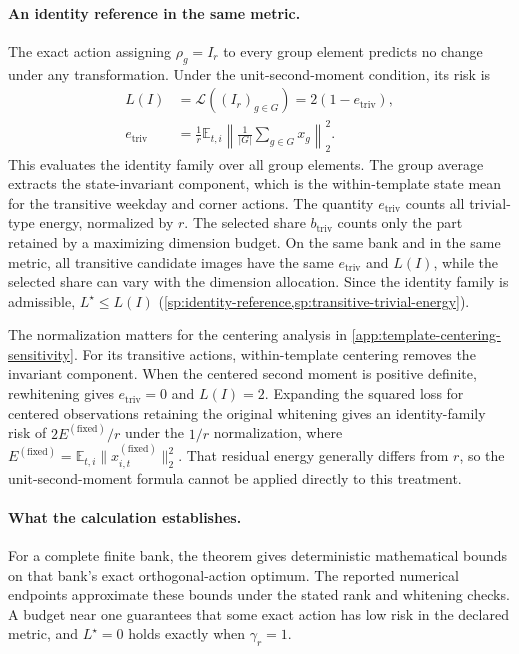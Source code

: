 \paragraph{An identity reference in the same metric.}
The exact action assigning $\rho_g=I_r$ to every group
element predicts no change under any transformation.
Under the unit-second-moment condition, its risk is
\begin{equation}
 \begin{aligned}
 L(I)
 &=
 \mathcal L((I_r)_{g\in G})
 =
 2(1-e_{\mathrm{triv}}),\\
 e_{\mathrm{triv}}
 &=
 \frac1r\mathbb E_{t,i}
 \left\|
   \frac1{|G|}\sum_{g\in G}x_g
 \right\|_2^2.
 \end{aligned}
 \label{eq:identity-reference-main}
\end{equation}
This evaluates the identity family over all group elements.
The group average extracts the state-invariant component,
which is the within-template state mean for the transitive
weekday and corner actions.
The quantity $e_{\mathrm{triv}}$ counts all trivial-type
energy, normalized by $r$.
The selected share $b_{\mathrm{triv}}$ counts only the part
retained by a maximizing dimension budget.
On the same bank and in the same metric, all transitive
candidate images have the same $e_{\mathrm{triv}}$ and
$L(I)$, while the selected share can vary with the dimension
allocation.
Since the identity family is admissible,
$L^\star\le L(I)$
(\cref{sp:identity-reference,sp:transitive-trivial-energy}).

The normalization matters for the centering analysis in
\cref{app:template-centering-sensitivity}.
For its transitive actions, within-template centering
removes the invariant component.
When the centered second moment is positive definite,
rewhitening gives $e_{\mathrm{triv}}=0$ and $L(I)=2$.
Expanding the squared loss for centered observations retaining
the original whitening gives an identity-family risk of
$2E^{(\mathrm{fixed})}/r$ under the $1/r$ normalization, where
$E^{(\mathrm{fixed})}
=\mathbb E_{t,i}\|x^{(\mathrm{fixed})}_{i,t}\|_2^2$.
That residual energy generally differs from $r$, so the
unit-second-moment formula cannot be applied directly to
this treatment.

\paragraph{What the calculation establishes.}
For a complete finite bank, the theorem gives deterministic
mathematical bounds on that bank's exact orthogonal-action
optimum.
The reported numerical endpoints approximate these bounds
under the stated rank and whitening checks.
A budget near one guarantees that some exact action has
low risk in the declared metric, and $L^\star=0$ holds
exactly when $\gamma_r=1$.

